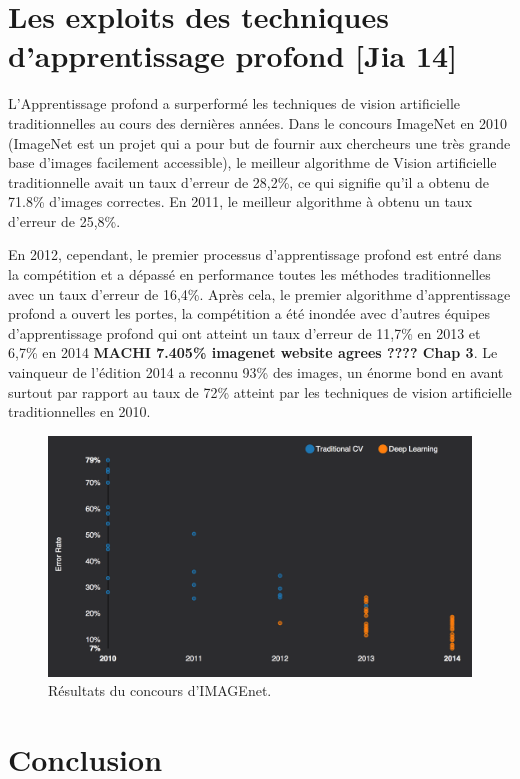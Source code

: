 \section{Les exploits des techniques d'apprentissage profond [Jia 14]}

L'Apprentissage profond a surperformé les techniques de vision artificielle traditionnelles au cours des dernières années. Dans le concours ImageNet en 2010 (ImageNet est un projet qui a pour but de fournir aux chercheurs une très grande base d'images facilement accessible), le meilleur algorithme de Vision artificielle traditionnelle avait un taux d'erreur de 28,2\%, ce qui signifie qu'il a obtenu de 71.8\% d'images correctes. En 2011, le meilleur algorithme à obtenu un taux d'erreur de 25,8\%. 

	En 2012, cependant, le premier processus d'apprentissage profond est entré dans la compétition et a dépassé en performance toutes les méthodes traditionnelles avec un taux d'erreur de 16,4\%. 
	Après cela, le premier algorithme d'apprentissage profond a ouvert les portes, la compétition a été inondée avec d'autres équipes d'apprentissage profond qui ont atteint un taux d'erreur de 11,7\% en 2013 et 6,7\% en 2014 \textbf{MACHI 7.405\% imagenet website agrees ???? Chap 3}. Le vainqueur de l'édition 2014 a reconnu 93\% des images, un énorme bond en avant surtout par rapport au taux de 72\% atteint par les techniques de vision artificielle traditionnelles en 2010.


\begin{figure}[H]
	\centering
		\includegraphics[width=5in]{Figures/clairifaiIMAGENET.png}
	\caption[An Electron]{Résultats du concours d'IMAGEnet.}
	\label{fig:Electron}
\end{figure}


\section{Conclusion}


